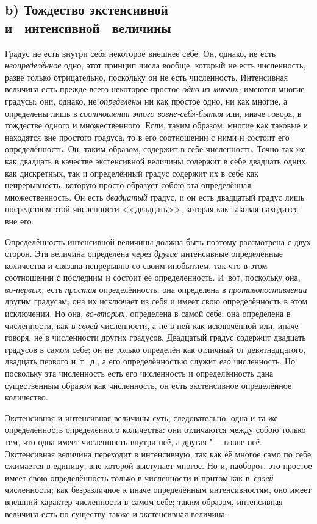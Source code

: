 \subsection[b) Тождество экстенсивной и интенсивной величины]%
{b) Тождество экстенсивной\nopagebreak\\и~ интенсивной~ величины}

Градус не есть внутри себя некоторое внешнее себе. Он, однако, не есть
{\em неопределённое} одно, этот принцип числа вообще, который не есть
численность, разве только отрицательно, поскольку он не есть численность.
Интенсивная величина есть прежде всего некоторое простое {\em одно из многих;}
имеются многие градусы; они, однако, не {\em определены} ни как простое одно,
ни как многие, а определены лишь в {\em соотношении этого вовне-себя-бытия} или,
иначе говоря, в тождестве одного и множественного. Если, таким образом, многие
как таковые и находятся вне простого градуса, то в его соотношении с ними и
состоит его определённость. Он, таким образом, содержит в себе численность.
Точно так же как двадцать в качестве экстенсивной величины содержит в себе
двадцать одних как дискретных, так и определённый градус содержит их в себе как
непрерывность, которую просто образует собою эта определённая множественность.
Он есть {\em двадцатый} градус, и он есть двадцатый градус лишь посредством
этой численности <<двадцать>>, которая как таковая находится вне его.

Определённость интенсивной величины должна быть поэтому рассмотрена с двух
сторон. Эта величина определена через {\em другие} интенсивные определённые
количества и связана непрерывно со своим инобытием, так что в этом соотношении
с последним и состоит её определённость. И~вот, поскольку она, {\em во-первых,}
есть {\em простая} определённость, она определена в {\em противопоставлении}
другим градусам; она их исключает из себя и имеет свою определённость в этом
исключении. Но она, {\em во-вторых,} определена в самой себе; она определена в
численности, как в {\em своей} численности, а не в ней как исключённой или,
иначе говоря, не в численности других градусов. Двадцатый градус содержит
двадцать градусов в самом себе; он не только определён как отличный от
девятнадцатого, двадцать первого и~т.~д., а его определённостью служит
{\em его} численность. Но поскольку эта численность есть его численность
и определённость дана существенным образом как численность, он есть
экстенсивное определённое количество.

Экстенсивная и интенсивная величины суть, следовательно, одна и та же
определённость определённого количества: они отличаются между собою только тем,
что одна имеет численность внутри неё, а другая "--- вовне неё.
Экстенсивная величина переходит в интенсивную, так как её многое само по себе
сжимается в единицу, вне которой выступает многое. Но и, наоборот, это простое
имеет свою определённость только в численности и притом как в~{\em своей}
численности; как безразличное к иначе определённым интенсивностям, оно имеет
внешний характер численности в самом себе; таким образом, интенсивная величина
есть по существу также и экстенсивная величина.

